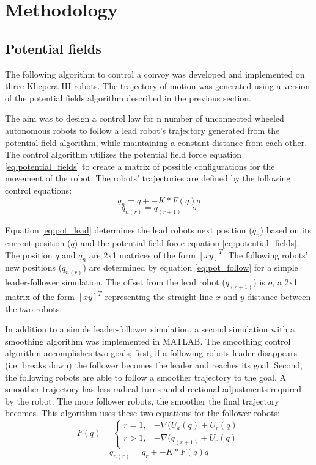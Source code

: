 \chapter{Methodology}
\section{Potential fields}
The following algorithm to control a convoy was developed and implemented on three Khepera III robots. The trajectory of motion was generated using a version of the potential fields algorithm described in the previous section.

The aim was to design a control law for n number of unconnected wheeled autonomous robots to follow a lead robot's trajectory generated from the potential field algorithm, while maintaining a constant distance from each other. The control algorithm utilizes the potential field force equation \eqref{eq:potential_fields} to create a matrix of possible configurations for the movement of the robot. The robots' trajectories are defined by the following control equations:
\begin{equation} \label{eq:pot_lead}
	q_n=q+-K*F(q)q
\end{equation}
\begin{equation} \label{eq:pot_follow}
	q_{n(r)}=q_{(r+1)}-o
\end{equation}

Equation \eqref{eq:pot_lead} determines the lead robots next position ($q_n$) based on its current position ($q$) and the potential field force equation \eqref{eq:potential_fields}. The position $q$ and $q_n$ are 2x1 matrices of the form $[x y]^T$. The following robots' new positions ($q_{n(r)}$) are determined by equation \eqref{eq:pot_follow} for a simple leader-follower simulation. The offset from the lead robot ($q_{(r+1)}$) is $o$, a 2x1 matrix of the form $[x y]^T$ representing the straight-line $x$ and $y$ distance between the two robots.

In addition to a simple leader-follower simulation, a second simulation with a smoothing algorithm was implemented in MATLAB. The smoothing control algorithm accomplishes two goals; first, if a following robots leader disappears (i.e. breaks down) the follower becomes the leader and reaches its goal. Second, the following robots are able to follow a smoother trajectory to the goal. A smoother trajectory has less radical turns and directional adjustments required by the robot. The more follower robots, the smoother the final trajectory becomes. This algorithm uses these two equations for the follower robots:
\begin{equation} \label{eq:pot_follow_force}
	F(q) =
	\begin{cases}
		r=1, & -\nabla(U_a(q)+U_r(q) \\
		r>1, & -\nabla(q_{(r+1)}+U_r(q)
	\end{cases}
\end{equation}
\begin{equation} \label{eq:pot_follow_q}
	q_{n(r)}=q_r+-K*F(q)\dot{q}
\end{equation}

